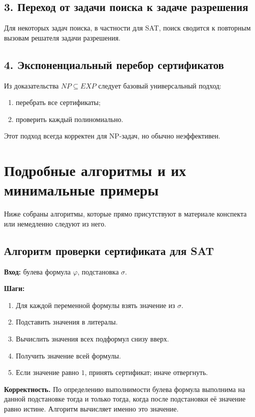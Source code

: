\documentclass[12pt,a4paper]{article}
\theoremstyle{definition}
\theoremstyle{plain}
\begin{document}
\subsection{3. Переход от задачи поиска к задаче разрешения}
Для некоторых задач поиска, в частности для \textsc{SAT}, поиск сводится к повторным вызовам решателя задачи разрешения.

\subsection{4. Экспоненциальный перебор сертификатов}
Из доказательства $NP\subseteq EXP$ следует базовый универсальный подход:
\begin{enumerate}
\item перебрать все сертификаты;
\item проверить каждый полиномиально.
\end{enumerate}
Этот подход всегда корректен для NP-задач, но обычно неэффективен.

\section{Подробные алгоритмы и их минимальные примеры}

Ниже собраны алгоритмы, которые прямо присутствуют в материале конспекта или немедленно следуют из него.

\subsection{Алгоритм проверки сертификата для \textsc{SAT}}
\textbf{Вход:} булева формула $\varphi$, подстановка $\sigma$.

\textbf{Шаги:}
\begin{enumerate}
\item Для каждой переменной формулы взять значение из $\sigma$.
\item Подставить значения в литералы.
\item Вычислить значения всех подформул снизу вверх.
\item Получить значение всей формулы.
\item Если значение равно $1$, принять сертификат; иначе отвергнуть.
\end{enumerate}

\textbf{Корректность.}
По определению выполнимости булева формула выполнима на данной подстановке тогда и только тогда, когда после подстановки её значение равно истине. Алгоритм вычисляет именно это значение.
\end{document}

